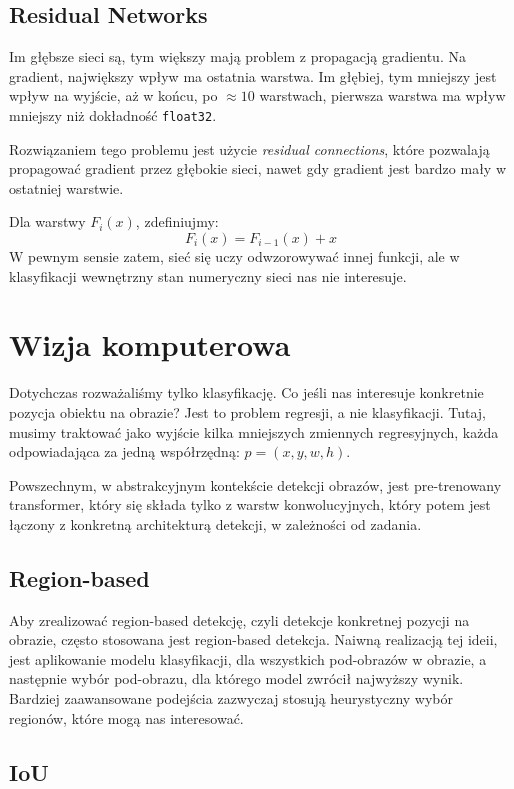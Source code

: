 \documentclass{../notatki}
\begin{document}
\subsection{Residual Networks}

Im głębsze sieci są, tym większy mają problem z propagacją gradientu.
Na gradient, największy wpływ ma ostatnia warstwa. Im głębiej, tym mniejszy
jest wpływ na wyjście, aż w końcu, po $\approx 10$ warstwach, pierwsza
warstwa ma wpływ mniejszy niż dokładność \texttt{float32}.

Rozwiązaniem tego problemu jest użycie \textit{residual connections}, które
pozwalają propagować gradient przez głębokie sieci, nawet gdy gradient
jest bardzo mały w ostatniej warstwie.

Dla warstwy $F_i(x)$, zdefiniujmy:
$$
F_i(x) = F_{i-1}(x) + x
$$
W pewnym sensie zatem, sieć się uczy odwzorowywać innej funkcji, ale
w klasyfikacji wewnętrzny stan numeryczny sieci nas nie interesuje.

\section{Wizja komputerowa}

Dotychczas rozważaliśmy tylko klasyfikację. Co jeśli nas interesuje konkretnie
pozycja obiektu na obrazie? Jest to problem regresji, a nie klasyfikacji.
Tutaj, musimy traktować jako wyjście kilka mniejszych zmiennych regresyjnych,
każda odpowiadająca za jedną współrzędną: $p = (x, y, w, h)$.

Powszechnym, w abstrakcyjnym kontekście detekcji obrazów, jest pre-trenowany
transformer, który się składa tylko z warstw konwolucyjnych, który potem
jest łączony z konkretną architekturą detekcji, w zależności od zadania.

\subsection{Region-based}

Aby zrealizować region-based detekcję, czyli detekcje konkretnej pozycji
na obrazie, często stosowana jest region-based detekcja. Naiwną realizacją
tej ideii, jest aplikowanie modelu klasyfikacji, dla wszystkich pod-obrazów
w obrazie, a następnie wybór pod-obrazu, dla którego model zwrócił najwyższy
wynik. Bardziej zaawansowane podejścia zazwyczaj stosują heurystyczny wybór
regionów, które mogą nas interesować.

\subsection{IoU}
\end{document}
